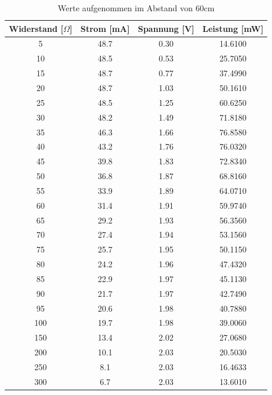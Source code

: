  \begin{table}[htbp]
\begin{tabular}{|c|c|c|c|}
\hline 
Widerstand [$\Omega$]	&Strom [mA]	&Spannung [V]	&Leistung [mW]\\	
\hline
5	&48.7	&0.30	&14.6100\\
10	&48.5	&0.53	&25.7050\\
15	&48.7	&0.77	&37.4990\\
20	&48.7	&1.03	&50.1610\\
25	&48.5	&1.25	&60.6250\\
30	&48.2	&1.49	&71.8180\\
35	&46.3	&1.66	&76.8580\\
40	&43.2	&1.76	&76.0320\\
45	&39.8	&1.83	&72.8340\\
50	&36.8	&1.87	&68.8160\\
55	&33.9	&1.89	&64.0710\\
60	&31.4	&1.91	&59.9740\\
65	&29.2	&1.93	&56.3560\\
70	&27.4	&1.94	&53.1560\\
75	&25.7	&1.95	&50.1150\\
80	&24.2	&1.96	&47.4320\\
85	&22.9	&1.97	&45.1130\\
90	&21.7	&1.97	&42.7490\\
95	&20.6	&1.98	&40.7880\\
100	&19.7	&1.98	&39.0060\\
150	&13.4	&2.02	&27.0680\\
200	&10.1	&2.03	&20.5030\\
250	&8.1	&2.03	&16.4633\\
300	&6.7	&2.03	&13.6010\\
\hline 
\end{tabular}
\caption{Werte aufgenommen im Abstand von 60cm} 
\end{table}

